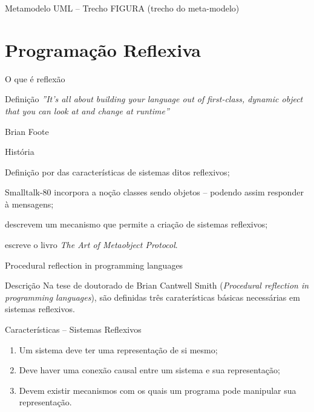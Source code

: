 \documentclass[12pt,t]{beamer}
\begin{document}
	 \begin{frame}{Metamodelo UML -- Trecho}
	 		\alert{FIGURA (trecho do meta-modelo)}
	 \end{frame}
 \section{Programação Reflexiva}
	 \begin{frame}{O que é reflexão}
	 	\begin{block}{Definição}
	 		\emph{''It's all about building your language out of first-class, dynamic object that you can look at and change at runtime''}
	 		\begin{flushright}
	 			Brian Foote
	 	\end{flushright} 	 		
	 	\end{block}
	 	\begin{block}{História}
	 		\begin{description}[9999]
	 			\item[1982] Definição por  das características de sistemas ditos reflexivos;
	 			\item[1983] Smalltalk-80 incorpora a noção classes sendo objetos -- podendo assim responder à mensagens;
	 			\item[1984]  descrevem um mecanismo que permite a criação de sistemas reflexivos;
	 			\item[1991]  escreve o livro \emph{The Art of Metaobject Protocol}.
	 		\end{description}
	 	\end{block}	
	 \end{frame}
	 \begin{frame}{Procedural reflection in programming languages \cite{smith1982reflection}}
	 	\begin{block}{Descrição}
	 		Na tese de doutorado de Brian Cantwell Smith (\emph{Procedural reflection in programming languages}), são definidas três caraterísticas básicas necessárias em sistemas reflexivos. 
	 	\end{block}
	 	\begin{block}{Características -- Sistemas Reflexivos}
	 	  \begin{enumerate}
	 	  	\item Um sistema deve ter uma representação de si mesmo;
	 	  	\item Deve haver uma conexão causal entre um sistema e sua representação;
	 	  	\item Devem existir mecanismos com os quais um programa pode manipular sua representação. 
	 	  \end{enumerate}
	 	\end{block}
	 \end{frame}
\end{document}

